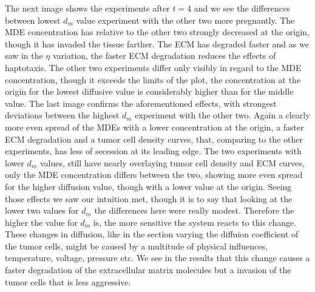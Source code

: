 The next image shows the experiments after $t=4$ and we see the differences between lowest $d_m$ value experiment with the other two more pregnantly. The MDE concentration has relative to the other two strongly decreased at the origin, though it has invaded the tissue farther. The ECM has degraded faster and as we saw in the $\eta$ variation, the faster ECM degradation reduces the effects of haptotaxis. The other two experiments differ only visibly in regard to the MDE concentration, though it exceeds the limits of the plot, the concentration at the origin for the lowest diffusive value is considerably higher than for the middle value.\newline
The last image confirms the aforementioned effects, with strongest deviations between the highest $d_m$ experiment with the other two. Again a clearly more even spread of the MDEs with a lower concentration at the origin, a faster ECM degradation and a tumor cell density curves, that, comparing to the other experiments, has less of secession at its leading edge. The two experiments with lower $d_m$ values, still have nearly overlaying tumor cell density and ECM curves, only the MDE concentration differs between the two, showing more even spread for the higher diffusion value, though with a lower value at the origin. \newline
Seeing those effects we saw our intuition met, though it is to say that looking at the lower two values for $d_m$ the differences here were really modest. Therefore the higher the value for $d_m$ is, the more sensitive the system reacts to this change.\newline
These changes in diffusion, like in the section varying the diffuion coefficient of the tumor cells, might be caused by a multitude of physical influences, temperature, voltage, pressure etc. We see in the results that this change causes a faster degradation of the extracellular matrix molecules but a invasion of the tumor cells that is less aggressive. 
